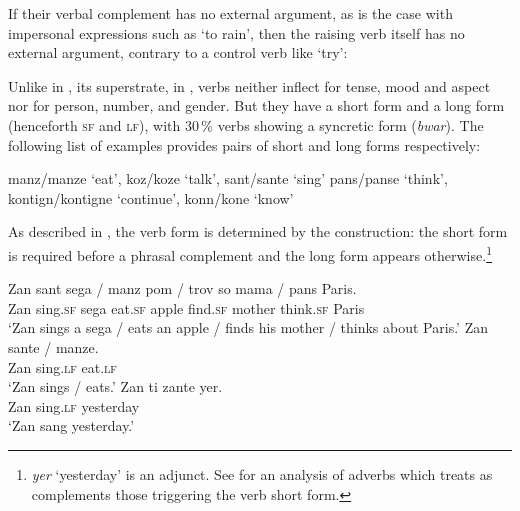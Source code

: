 \documentclass[output=paper
	        ,collection
	        ,collectionchapter
 	        ,biblatex
                ,babelshorthands
                ,newtxmath
                ,draftmode
                ,colorlinks, citecolor=brown
]{langscibook}
\begin{document}
\eal
{}
\zl
 
If their verbal complement has no external argument, as is the case with impersonal expressions such as  `to rain', then the raising verb itself has no external argument, contrary to a control verb like  `try':

\eal
{}
\zl

Unlike in , its superstrate, in ,  verbs neither inflect for tense, mood and aspect nor for person, number, and
gender. But they have a short form and a long form (henceforth \textsc{sf} and \textsc{lf}), with
30\,\% verbs showing a syncretic form (\emph{bwar}). The following list of examples provides pairs of short and
long forms respectively:

\eal
\ex manz/manze `eat', koz/koze `talk', sant/sante `sing'
\ex pans/panse `think', kontign/kontigne `continue', konn/kone `know'
\zl

As described in \citet{Henri2010}, the verb form is determined by the construction: the short form is required before a phrasal complement and the long form appears otherwise.\footnote{\textit{yer} `yesterday' is an adjunct. See  for an analysis of  adverbs which treats as complements those triggering the verb short form.}


\begin{exe}
\ex \begin{xlist}
\ex 
\gll Zan sant sega / manz pom / trov so mama / pans Paris. \\
     Zan sing.\textsc{sf} sega {} eat.\textsc{sf} apple {} find.\textsc{sf} \POSS{} mother {} think.\textsc{sf} Paris \\
\glt `Zan sings a sega / eats an apple / finds his mother / thinks about Paris.'	
\ex 
\gll Zan sante / manze.\\
     Zan sing.\textsc{lf} {} eat.\textsc{lf}\\
\glt `Zan sings / eats.'
\ex 
\gll Zan ti zante yer. \\
Zan  \PRF{} sing.\textsc{lf} yesterday\\
\glt `Zan sang yesterday.'
\end{xlist}
\end{exe}
\end{document}
